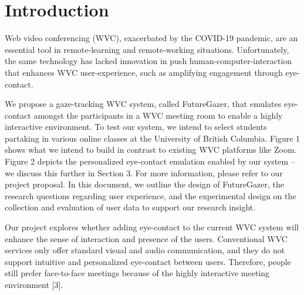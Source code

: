 \documentclass[sigconf,authordraft]{acmart}
\begin{document}
\maketitle

\section{Introduction}
Web video conferencing (WVC), exacerbated by the COVID-19 pandemic, are an essential tool in remote-learning and remote-working situations. Unfortunately, the same technology has lacked innovation in push human-computer-interaction that enhances WVC user-experience, such as amplifying engagement through eye-contact.

We propose a gaze-tracking WVC system, called FutureGazer, that emulates eye-contact amongst the participants in a WVC meeting room to enable a highly interactive environment. To test our system, we intend to select students partaking in various online classes at the University of British Columbia. Figure 1 shows what we intend to build in contrast to existing WVC platforms like Zoom. Figure 2 depicts the personalized eye-contact emulation enabled by our system -- we discuss this further in Section 3. For more information, please refer to our project proposal.
In this document, we outline the design of FutureGazer, the research questions regarding user experience, and the experimental design on the collection and evaluation of user data to support our research insight.

Our project explores whether adding eye-contact to the current WVC system will enhance the sense of interaction and presence of the users. Conventional WVC services only offer standard visual and audio communication, and they do not support intuitive and personalized eye-contact between users. Therefore, people still prefer face-to-face meetings because of the highly interactive meeting environment [3].
\end{document}

